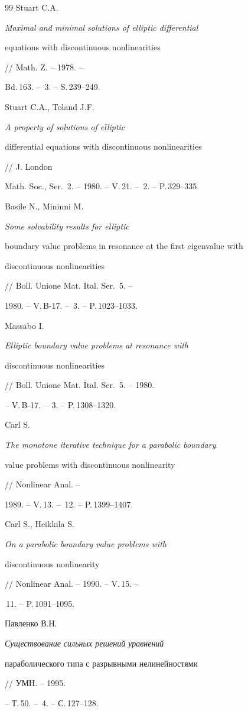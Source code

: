 \begin{thebibliography}{99}
Stuart C.A. {\em Maximal and minimal solutions of elliptic differential 


equations with discontinuous nonlinearities} // Math. Z. -- 1978. -- 


Bd.\,163. -- \No\,3. -- S.\,239--249. 




Stuart C.A., Toland J.F. {\em A property of solutions of elliptic 


differential equations with discontinuous nonlinearities} // J. London 


Math. Soc., Ser.~2. -- 1980. -- V.\,21. -- \No\,2. -- P.\,329--335. 




Basile N., Mininni M. {\em Some solvability results for elliptic 


boundary value problems in resonance at the first eigenvalue with 


discontinuous nonlinearities} // Boll. Unione Mat. Ital. Ser.~5. -- 


1980. -- V.\,B-17. -- \No\,3. -- P.\,1023--1033. 




Massabo I. {\em Elliptic boundary value problems at resonance with 


discontinuous nonlinearities} // Boll. Unione Mat. Ital. Ser.~5. -- 1980. 


-- V.\,B-17. -- \No\,3. -- P.\,1308--1320. 




Carl S. {\em The monotone iterative technique for a parabolic boundary 


value problems with discontinuous nonlinearity} // Nonlinear Anal. -- 


1989. -- V.\,13. -- \No\,12. -- P.\,1399--1407. 




Carl S., Heikkila S. {\em On a parabolic boundary value problems with 


discontinuous nonlinearity} // Nonlinear Anal. -- 1990. -- V.\,15. -- 


\No\,11. -- P.\,1091--1095. 




Павленко В.Н. {\em Существование сильных решений уравнений 


параболического типа с разрывными нелинейностями} // УМН. -- 1995. 


-- Т.\,50. -- \No\,4. -- С.\,127--128. 



\end{thebibliography}
